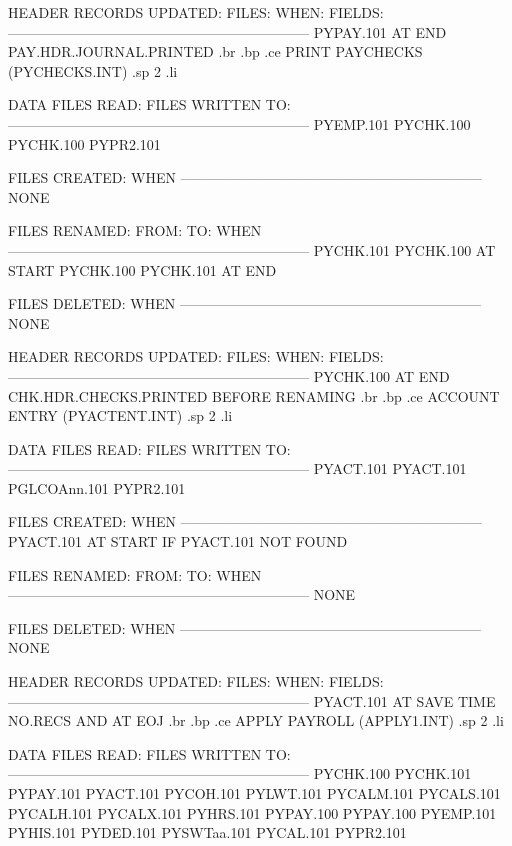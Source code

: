 HEADER RECORDS UPDATED:
FILES:		 WHEN:		    FIELDS:
-----------------------------------------------------------------
 PYPAY.101	AT END		   PAY.HDR.JOURNAL.PRINTED%
.br
.bp
.ce
PRINT PAYCHECKS  (PYCHECKS.INT)
.sp 2
.li

DATA FILES READ:		   FILES WRITTEN TO:
-----------------------------------------------------------------
       PYEMP.101
       PYCHK.100			PYCHK.100
					PYPR2.101

FILES CREATED:			  WHEN
-----------------------------------------------------------------
       NONE


FILES RENAMED:
  FROM:        TO:		  WHEN
-----------------------------------------------------------------
 PYCHK.101  PYCHK.100	      AT START
 PYCHK.100  PYCHK.101	      AT END


FILES DELETED:			  WHEN
-----------------------------------------------------------------
       NONE


HEADER RECORDS UPDATED:
FILES:		 WHEN:		    FIELDS:
-----------------------------------------------------------------
 PYCHK.100	AT END		   CHK.HDR.CHECKS.PRINTED%
		BEFORE RENAMING
.br
.bp
.ce
ACCOUNT ENTRY  (PYACTENT.INT)
.sp 2
.li

DATA FILES READ:		   FILES WRITTEN TO:
-----------------------------------------------------------------
       PYACT.101			PYACT.101
       PGLCOAnn.101
					PYPR2.101


FILES CREATED:			  WHEN
-----------------------------------------------------------------
       PYACT.101	      AT START IF PYACT.101 NOT FOUND


FILES RENAMED:
  FROM:        TO:		  WHEN
-----------------------------------------------------------------
      NONE


FILES DELETED:			  WHEN
-----------------------------------------------------------------
      NONE


HEADER RECORDS UPDATED:
FILES:		 WHEN:		    FIELDS:
-----------------------------------------------------------------
 PYACT.101	AT SAVE TIME	   NO.RECS%
		AND AT EOJ
.br
.bp
.ce
APPLY PAYROLL  (APPLY1.INT)
.sp 2
.li

DATA FILES READ:		   FILES WRITTEN TO:
-----------------------------------------------------------------
       PYCHK.100
       PYCHK.101
       PYPAY.101
       PYACT.101
       PYCOH.101
       PYLWT.101
       PYCALM.101
       PYCALS.101
       PYCALH.101
       PYCALX.101
       PYHRS.101
       PYPAY.100			PYPAY.100
       PYEMP.101
       PYHIS.101
       PYDED.101
       PYSWTaa.101
       PYCAL.101
					PYPR2.101


